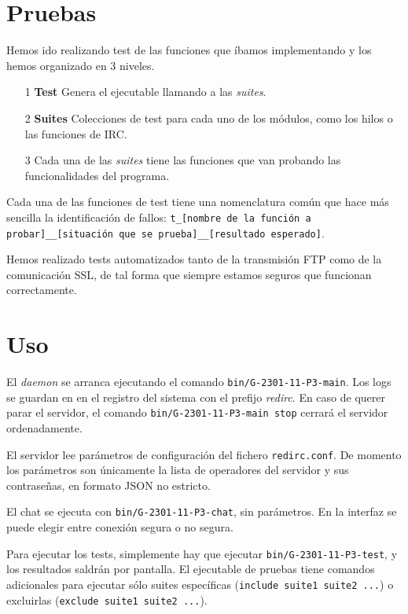 \documentclass{article}
\begin{document}
\section{Pruebas}
Hemos ido realizando test de las funciones que íbamos implementando y los hemos organizado en 3 niveles. 

\begin{itemize}
\item[1] \textbf{Test} Genera el ejecutable llamando a las \textit{suites}.
\item[2] \textbf{Suites} Colecciones de test para cada uno de los módulos, como los hilos o las funciones de IRC.
\item[3] Cada una de las \textit{suites} tiene las funciones que van probando las funcionalidades del programa.
\end{itemize}

Cada una de las funciones de test tiene una nomenclatura común que hace más sencilla la identificación de fallos: \texttt{t\_[nombre de la función a probar]\_\_[situación que se prueba]\_\_[resultado esperado]}.

Hemos realizado tests automatizados tanto de la transmisión FTP como de la comunicación SSL, de tal forma que siempre estamos seguros que funcionan correctamente.

\section{Uso}

El \textit{daemon} se arranca ejecutando el comando \texttt{bin/G-2301-11-P3-main}. Los logs se guardan en en el registro del sistema con el prefijo \textit{redirc}. En caso de querer parar el servidor, el comando \texttt{bin/G-2301-11-P3-main stop} cerrará el servidor ordenadamente.

El servidor lee parámetros de configuración del fichero \texttt{redirc.conf}. De momento los parámetros son únicamente la lista de operadores del servidor y sus contraseñas, en formato JSON no estricto.

El chat se ejecuta con \texttt{bin/G-2301-11-P3-chat}, sin parámetros. En la interfaz se puede elegir entre conexión segura o no segura.

Para ejecutar los tests, simplemente hay que ejecutar \texttt{bin/G-2301-11-P3-test}, y los resultados saldrán por pantalla. El ejecutable de pruebas tiene comandos adicionales para ejecutar sólo suites específicas (\texttt{include suite1 suite2 ...}) o excluirlas (\texttt{exclude suite1 suite2 ...}).
\end{document}
